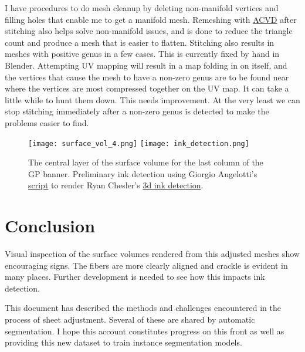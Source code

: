 \documentclass{article}
\begin{document}
I have procedures to do mesh cleanup by deleting non-manifold vertices and filling holes that enable me to get a manifold mesh. Remeshing with \href{https://github.com/valette/ACVD}{ACVD} after stitching also helps solve non-manifold issues, and is done to reduce the triangle count and produce a mesh that is easier to flatten. Stitching also results in meshes with positive genus in a few cases. This is currently fixed by hand in Blender. Attempting UV mapping will result in a map folding in on itself, and the vertices that cause the mesh to have a non-zero genus are to be found near where the vertices are most compressed together on the UV map. It can take a little while to hunt them down. This needs improvement. At the very least we can stop stitching immediately after a non-zero genus is detected to make the problems easier to find.

\begin{figure}
    \centering
    \texttt{[image: surface\_vol\_4.png]}
    \texttt{[image: ink\_detection.png]}
    \caption{The central layer of the surface volume for the last column of the GP banner. Preliminary ink detection using Giorgio Angelotti's \href{https://gist.github.com/giorgioangel/6ae26b126f364dda751a10be0b90b36d}{script} to render Ryan Chesler's \href{https://github.com/ryanchesler/3d-ink-detection}{3d ink detection}.}
    \label{render}
\end{figure}

\section{Conclusion}

Visual inspection of the surface volumes rendered from this adjusted meshes show encouraging signs. The fibers are more clearly aligned and crackle is evident in many places. Further development is needed to see how this impacts ink detection.

This document has described the methods and challenges encountered in the process of sheet adjustment. Several of these are shared by automatic segmentation. I hope this account constitutes progress on this front as well as providing this new dataset to train instance segmentation models.
\end{document}
